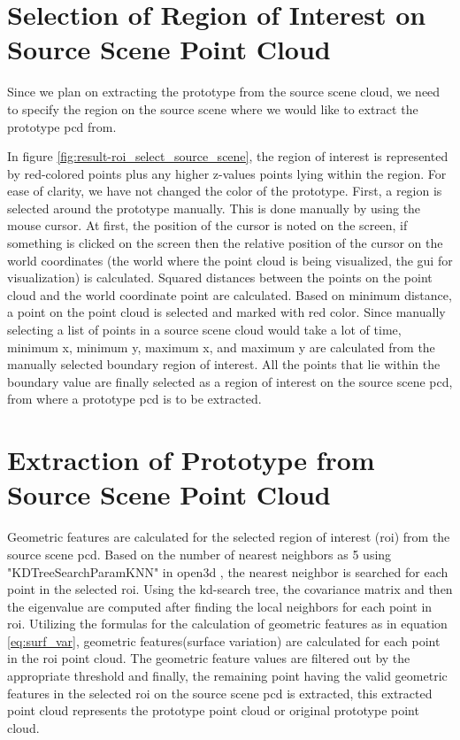 \section{Selection of Region of Interest on Source Scene Point Cloud}
Since we plan on extracting the prototype from the source scene cloud, we need to specify the region on the source scene where we would like to extract the prototype \acrshort{pcd} from.

In figure \ref{fig:result-roi_select_source_scene}, the region of interest is represented by red-colored points plus any higher z-values points lying within the region. For ease of clarity, we have not changed the color of the prototype. First, a region is selected around the prototype manually. This is done manually by using the mouse cursor. At first, the position of the cursor is noted on the screen, if something is clicked on the screen then the relative position of the cursor on the world coordinates (the world where the point cloud is being visualized, the \acrshort{gui} for visualization) is calculated. Squared distances between the points on the point cloud and the world coordinate point are calculated. Based on minimum distance, a point on the point cloud is selected and marked with red color. Since manually selecting a list of points in a source scene cloud would take a lot of time, minimum x, minimum y, maximum x, and maximum y are calculated from the manually selected boundary region of interest. All the points that lie within the boundary value are finally selected as a region of interest on the source scene \acrshort{pcd}, from where a prototype \acrshort{pcd} is to be extracted.

\section{Extraction of Prototype from Source Scene Point Cloud}
Geometric features are calculated for the selected region of interest (\acrshort{roi}) from the source scene \acrshort{pcd}. Based on the number of nearest neighbors as 5 using "KDTreeSearchParamKNN" in open3d \parencite{open3d}, the nearest neighbor is searched for each point in the selected \acrshort{roi}. Using the kd-search tree, the covariance matrix and then the eigenvalue are computed after finding the local neighbors for each point in \acrshort{roi}. Utilizing the formulas for the calculation of geometric features as in equation \ref{eq:surf_var}, geometric features(surface variation) are calculated for each point in the \acrshort{roi} point cloud. The geometric feature values are filtered out by the appropriate threshold and finally, the remaining point having the valid geometric features in the selected \acrshort{roi} on the source scene \acrshort{pcd} is extracted, this extracted point cloud represents the prototype point cloud or original prototype point cloud.

